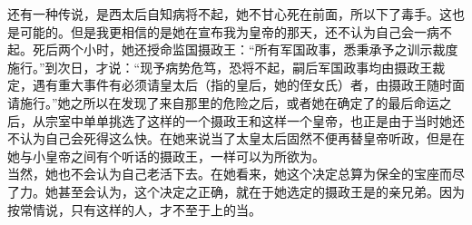 还有一种传说，是西太后自知病将不起，她不甘心死在前面，所以下了毒手。这也是可能的。但是我更相信的是她在宣布我为皇帝的那天，还不认为自己会一病不起。死后两个小时，她还授命监国摄政王：“所有军国政事，悉秉承予之训示裁度施行。”到次日，才说：“现予病势危笃，恐将不起，嗣后军国政事均由摄政王裁定，遇有重大事件有必须请皇太后（指的皇后，她的侄女氏）者，由摄政王随时面请施行。”她之所以在发现了来自那里的危险之后，或者她在确定了的最后命运之后，从宗室中单单挑选了这样的一个摄政王和这样一个皇帝，也正是由于当时她还不认为自己会死得这么快。在她来说当了太皇太后固然不便再替皇帝听政，但是在她与小皇帝之间有个听话的摄政王，一样可以为所欲为。\\

当然，她也不会认为自己老活下去。在她看来，她这个决定总算为保全的宝座而尽了力。她甚至会认为，这个决定之正确，就在于她选定的摄政王是的亲兄弟。因为按常情说，只有这样的人，才不至于上的当。
